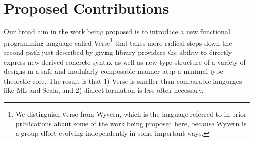 \section{Proposed Contributions}
Our broad aim in the work being proposed is to introduce a new functional programming language called Verse\footnote{We distinguish Verse from Wyvern, which is the language referred to in prior publications about some of the work being proposed here, because Wyvern is a group effort evolving independently in some important ways.} that takes more radical steps down the second path just described by giving library providers the ability to directly express new derived concrete syntax as well as new type structure of a variety of designs in a safe and modularly composable manner atop a minimal type-theoretic core. The result is that 1) Verse is smaller than comparable languages like ML and Scala, and 2) dialect formation is less often necessary.%

